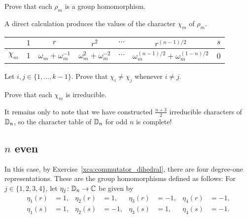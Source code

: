\begin{exercise}
\label{xca:rho_m}
    Prove that each $\rho_m$ is a group homomorphism.
\end{exercise}

A direct calculation produces the values of the 
character $\chi_m$ of $\rho_m$.

\bigskip 
\begin{center}
    \begin{tabular}{|c|cccccc|}
         \hline 
         & $1$ & $r$ & $r^2$ & $\cdots$  & $r^{(n-1)/2}$ & $s$\\
         \hline 
         $\chi_m$ & $1$ & $\omega_m+\omega_m^{-1}$ & $\omega_m^2+\omega_m^{-2}$ & $\cdots$ & $\omega_m^{(n-1)/2}+\omega_m^{(1-n)/2}$ & 0\\
         \hline 
    \end{tabular}
\end{center}
\bigskip 

\begin{exercise}
\label{xca:chim_alldifferent}
    Let $i,j\in\{1,\dots,k-1\}$. Prove that $\chi_i\ne\chi_j$ whenever $i\ne j$.
\end{exercise}

\begin{exercise}
\label{xca:chim_irreducible}
    Prove that each $\chi_m$ is irreducible. 
\end{exercise}

It remains only to note that we have constructed 
$\frac{n+3}{2}$ irreducible characters of $\mathbb{D}_n$, 
so the character table of $\mathbb{D}_n$ for odd $n$ 
is complete!

\subsection{$n$ even}

In this case, by Exercise~\ref{xca:commutator_dihedral}, there are four 
degree-one representations. These are the group homomorphisms defined as follows: For $j\in\{1,2,3,4\}$, let $\eta_j\colon\mathbb{D}_n\to\mathbb{C}$ be given by 
\begin{align*}
    \eta_1(r)&=1, & \eta_2(r)&=1, &  \eta_3(r)&=-1, & \eta_4(r)&=-1,\\
    \eta_1(s)&=1, & \eta_2(s)&=-1, & \eta_3(s)&=1, &  \eta_4(s)&=-1.\\
\end{align*}

